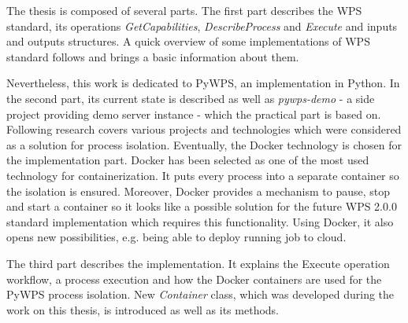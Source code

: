 The thesis is composed of several parts. The first part describes the WPS standard, its operations 
\textit{GetCapabilities}, \textit{DescribeProcess} and \textit{Execute} and inputs and outputs structures. A quick
overview of some implementations of WPS standard follows and brings a basic information about them.

Nevertheless, this work is dedicated to PyWPS, an implementation in
Python. In the second part, its current state is described as well as
\textit{pywps-demo} - a side project providing demo server instance -
which the practical part is based on. Following research 
covers various projects and technologies which were considered as a
solution for process isolation. Eventually, the Docker technology is
chosen for the implementation part.  Docker has been selected as one
of the most used technology for containerization. It puts every
process into a separate container so the isolation is
ensured. Moreover, Docker provides a mechanism to pause, stop and
start a container so it looks like a possible solution for the future
WPS 2.0.0 standard implementation which requires this
functionality. Using Docker, it also opens new possibilities,
e.g. being able to deploy running job to cloud.

The third part describes the implementation. It explains the Execute
operation workflow, a process execution and how the Docker containers
are used for the PyWPS process isolation. New \textit{Container}
class, which was developed during the work on this thesis, is
introduced as well as its methods.
